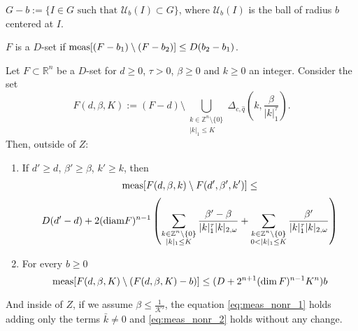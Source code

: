 \begin{definition}
$G-b := \{I\in G \text{ such that } \mathcal{U}_b(I)\subset G\}$, where $\mathcal{U}_b(I)$ is the ball of radius $b$ centered at $I$.
\end{definition}
\begin{definition}
$F$ is a $D$-set if $\textnormal{meas}[(F-b_1)\setminus (F-b_2)] \leq D(b_2 - b_1)$.
\end{definition}

\begin{lemma}\label{lemma:measures_nonresonant}
Let $F \subset \mathbb{R}^n$ be a $D$-set for $d \geq 0$, $\tau > 0$, $\beta \geq 0$ and $k \geq 0$ an integer. Consider the set
$$F(d,\beta,K) := (F-d)\setminus \bigcup_{\substack{k\in\mathbb{Z}^n\setminus\{0\} \\ |k|_1 \leq K}} \Delta_{c,\hat q}\left(k,\frac{\beta}{|k|_1^\tau}\right).$$
Then, outside of $Z$:
\begin{enumerate}
\item\label{eq:meas_nonr_1} If $d'\geq d$,  $\beta'\geq \beta$, $k' \geq k$, then
$$
\textnormal{meas}[F(d,\beta,k)\setminus F(d',\beta',k')] \leq
 $$
$$ D(d' - d) + 2(\textnormal{diam}F)^{n-1}
\left(\sum_{\substack{k\in\mathbb{Z}^n\setminus\{0\}
\\ |k|_1 \leq K}}\frac{\beta' - \beta}{|k|_1^\tau|k|_{2,\omega}}
 + \sum_{\substack{k\in\mathbb{Z}^n\setminus\{0\} \\ 0 < |k|_1 \leq K}}
\frac{\beta'}{|k|_1^\tau|k|_{2,\omega}}\right)
$$
\item\label{eq:meas_nonr_2} For every $b \geq 0$
$$\textnormal{meas}[F(d,\beta,K)\setminus(F(d,\beta,K)-b)]\leq (D + 2^{n+1}(\dim F)^{n-1}K^n)b$$
\end{enumerate}
And inside of $Z$, if we assume $\beta \leq \frac{1}{\mathcal{K}'}$, the equation \ref{eq:meas_nonr_1} holds adding only the terms $\bar k \neq 0$ and \ref{eq:meas_nonr_2} holds without any change.
\end{lemma}



